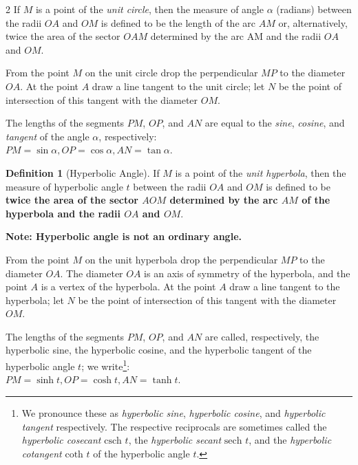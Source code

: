 \documentclass[11pt]{article}
\theoremstyle{definition}
\newtheorem{definition}{Definition}
\theoremstyle{plain}
\theoremstyle{problemstyle}
\theoremstyle{remark}
\theoremstyle{definition}
\begin{document}
\begin{multicols}{2}
    If $M$ is a point of the \emph{unit circle}, then the measure of angle $\alpha$ (radians) between the radii $OA$ and $OM$ is defined to be the length of the arc $AM$ or, alternatively, twice the area of the sector $OAM$ determined by the arc AM and the radii $OA$ and $OM$. 

    From the point $M$ on the unit circle drop the perpendicular $MP$ to the diameter $OA$. At the point $A$ draw a line tangent to the unit circle; let $N$ be the point of intersection of this tangent with the diameter $OM$.

    The lengths of the segments $PM$, $OP$, and $AN$ are equal to
    the \emph{sine}, \emph{cosine}, and \emph{tangent} of the angle $\alpha$, respectively:\\
    $PM=\sin\alpha, OP=\cos\alpha, AN=\tan\alpha$.

    \columnbreak

    \begin{definition}[Hyperbolic Angle]
        \label{def:hyperbolic-angle}
    If $M$ is a point of the \emph{unit hyperbola}, then the measure of hyperbolic angle $t$ between the radii $OA$ and $OM$ is defined to be \textbf{twice the area of the sector $AOM$ determined by the arc $AM$ of the hyperbola and the radii $OA$ and $OM$}.

        \textbf{Note: Hyperbolic angle is not an ordinary angle.}
    \end{definition}
From the point $M$ on the unit hyperbola drop the perpendicular $MP$ to the diameter $OA$. The diameter $OA$ is an axis of symmetry of the hyperbola, and the point $A$ is a vertex of the hyperbola. At the point $A$ draw a line tangent to the hyperbola; let $N$ be the point of intersection of this tangent with the diameter $OM$.

    The lengths of the segments $PM$, $OP$, and $AN$ are called, respectively, the hyperbolic sine, the hyperbolic cosine, and the hyperbolic tangent of the hyperbolic angle $t$; we write\footnote{We pronounce these as \emph{hyperbolic sine}, \emph{hyperbolic cosine}, and \emph{hyperbolic tangent} respectively. The respective reciprocals are sometimes called the \emph{hyperbolic cosecant} $\text{csch } t$, the \emph{hyperbolic secant} $\text{sech } t$, and the \emph{hyperbolic cotangent} $\text{coth } t$ of the hyperbolic angle $t$.}:\\
$PM = \sinh t, OP = \cosh t, AN = \tanh t$.

\end{multicols}
\end{document}

